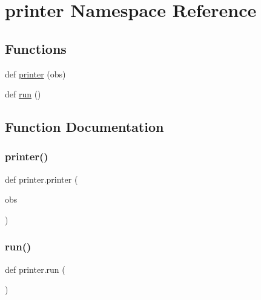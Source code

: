 \hypertarget{namespaceprinter}{}\section{printer Namespace Reference}
\label{namespaceprinter}
\subsection*{Functions}
\begin{DoxyCompactItemize}
\item 
def \hyperlink{namespaceprinter_a3eb27980abedac28745fb43f61bfe198}{printer} (obs)
\item 
def \hyperlink{namespaceprinter_abd8f2589552090a9b3b5f2cd1f941b8b}{run} ()
\end{DoxyCompactItemize}


\subsection{Function Documentation}
\mbox{\label{namespaceprinter_a3eb27980abedac28745fb43f61bfe198}} 
\subsubsection{\texorpdfstring{printer()}{printer()}}
{\footnotesize\ttfamily def printer.\+printer (\begin{DoxyParamCaption}\item[{}]{obs }\end{DoxyParamCaption})}

\mbox{\label{namespaceprinter_abd8f2589552090a9b3b5f2cd1f941b8b}} 
\subsubsection{\texorpdfstring{run()}{run()}}
{\footnotesize\ttfamily def printer.\+run (\begin{DoxyParamCaption}{ }\end{DoxyParamCaption})}

